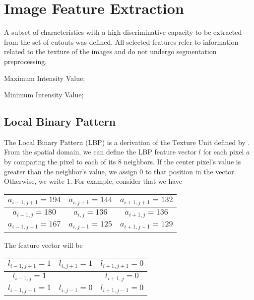 \chapter{Image Feature Extraction}

A subset of characteristics
with a high discriminative capacity
to be extracted
from the set of cutouts
was defined.
All selected features
refer to information related to the texture of the images
and do not undergo segmentation preprocessing.



Maximum Intensity Value;

Minimum Intensity Value;

\section{Local Binary Pattern}

The Local Binary Pattern (LBP)
is a derivation of the Texture Unit
defined by \cite{wang_texture_1990}.
From the spatial domain,
we can define the LBP feature vector $l$
for each pixel $a$
by comparing the pixel to each of its 8 neighbors.
If the center pixel's value is greater than the neighbor's value,
we assign $0$ to that position in the vector.
Otherwise,
we write $1$.
For example,
consider that we have

\begin{center}
\begin{tabular}{|c|c|c|}
  \hline
  $a_{i - 1, j + 1} = 194$ & $a_{i, j + 1} = 144$ & $a_{i + 1, j + 1} = 132$ \\
  \hline
  $a_{i - 1, j} = 180$ & $a_{i, j} = 136$ & $a_{i + 1, j} = 136$ \\
  \hline
  $a_{i - 1, j - 1} = 167$ & $a_{i, j - 1} = 125$ & $a_{i + 1, j - 1} = 129$ \\
  \hline
\end{tabular}
\end{center}

The feature vector will be

\begin{center}
\begin{tabular}{|c|c|c|}
  \hline
  $l_{i - 1, j + 1} = 1$ & $l_{i, j + 1} = 1$ & $l_{i + 1, j + 1} = 0$ \\
  \hline
  $l_{i - 1, j} = 1$ & & $l_{i + 1, j} = 0$ \\
  \hline
  $l_{i - 1, j - 1} = 1$ & $l_{i, j - 1} = 0$ & $l_{i + 1, j - 1} = 0$ \\
  \hline
\end{tabular}
\end{center}

